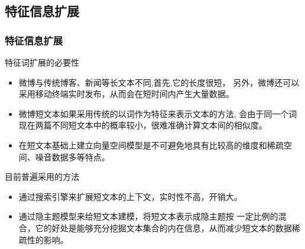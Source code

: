 \documentclass[CJKutf8, table]{beamer}
\begin{document}
\begin{CJK}{UTF8}{gbsn}
\subsection{特征信息扩展}
\begin{frame}
  \frametitle{特征信息扩展}
  \begin{scriptsize}
    \pause
    \begin{block}{特征词扩展的必要性}
      \begin{itemize}
        \item{微博与传统博客、新闻等长文本不同,首先,它的长度很短，
          另外，微博还可以采用移动终端实时发布，从而会在短时间内产生大量数据。}
          \pause
        \item{微博短文本如果采用传统的以词作为特征来表示文本的方法,
          会由于同一个词现在两篇不同短文本中的概率较小，很难准确计算文本间的相似度。}
          \pause
        \item{在短文本基础上建立向量空间模型是不可避免地具有比较高的维度和稀疏空间、噪音数据多等特点。}
        \end{itemize}
    \end{block}
  \end{scriptsize}
  \begin{scriptsize}
    \pause
    \begin{block}{目前普遍采用的方法}
      \begin{itemize}
          \pause
        \item{通过搜索引擎来扩展短文本的上下文，实时性不高，开销大。}
          \pause
        \item{通过隐主题模型来给短文本建模，将短文本表示成隐主题按
          一定比例的混合，它的好处是能够充分挖掘文本集合的内在信息，从而减少短文本的数据稀疏性的影响。}
        \end{itemize}
    \end{block}
  \end{scriptsize}
\end{frame}


\end{CJK}
\end{document}
